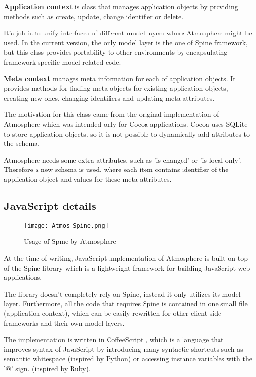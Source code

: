 \textbf{Application context} is class that manages application objects by providing methods such as create, update, change identifier or delete.

It's job is to unify interfaces of different model layers where Atmosphere might be used. In the current version, the only model layer is the one of Spine framework, but this class provides portability to other environments by encapsulating framework-specific model-related code.

\textbf{Meta context} manages meta information for each of application objects. It provides methods for finding meta objects for existing application objects, creating new ones, changing identifiers and updating meta attributes.

The motivation for this class came from the original implementation of Atmosphere which was intended only for Cocoa applications. Cocoa uses SQLite to store application objects, so it is not possible to dynamically add attributes to the schema.

Atmosphere needs some extra attributes, such as 'is changed' or 'is local only'. Therefore a new schema is used, where each item contains identifier of the application object and values for these meta attributes.

\subsection{JavaScript details}

\begin{figure}[htbp]
  \centering
    \texttt{[image: Atmos-Spine.png]}
  \caption{Usage of Spine by Atmosphere}
  \label{fig:figures_Atmos-Spine}
\end{figure}


At the time of writing, JavaScript implementation of Atmosphere is built on top of the Spine \citep{spinejs} library which is a lightweight framework for building JavaScript web applications.

The library doesn’t completely rely on Spine, instead it only utilizes its model layer. Furthermore, all the code that requires Spine is contained in one small file (application context), which can be easily rewritten for other client side frameworks and their own model layers.

The implementation is written in CoffeeScript \citep{coffeescript}, which is a language that improves syntax of JavaScript by introducing many syntactic shortcuts such as semantic whitespace (inspired by Python) or accessing instance variables with the '@' sign. (inspired by Ruby).

